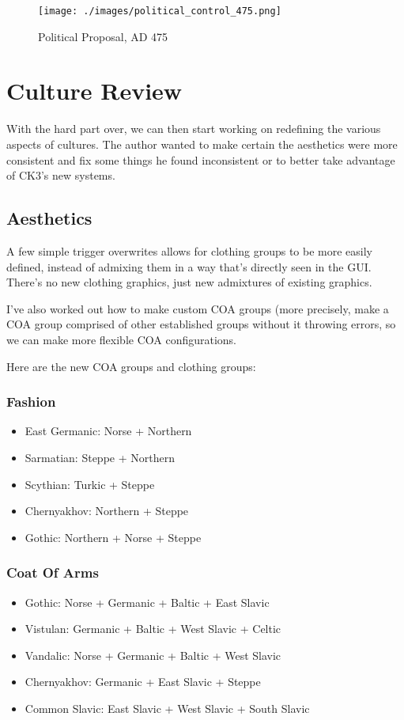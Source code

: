 \documentclass{article}
\begin{document}
	\begin{figure}[h!]
		\centering
		\texttt{[image: ./images/political\_control\_475.png]}
		\caption{Political Proposal, AD 475}
	\end{figure}
	
	\newpage
	
	\section{Culture Review}
	\label{sec:culture_review}
	
	With the hard part over, we can then start working on redefining the various aspects of cultures.
	The author wanted to make certain the aesthetics were more consistent and fix some things he found inconsistent or to better take advantage of CK3's new systems.
	
	\subsection{Aesthetics}
	\label{sec:culture_review:subsec:aesthetics}
	A few simple trigger overwrites allows for clothing groups to be more easily defined, instead of admixing them in a way that’s directly seen in the GUI. There’s no new clothing graphics, just new admixtures of existing graphics.
	
	I’ve also worked out how to make custom COA groups (more precisely, make a COA group comprised of other established groups without it throwing errors, so we can make more flexible COA configurations.
	
	Here are the new COA groups and clothing groups:
	
	\subsubsection{Fashion}
	\begin{itemize}
		\item East Germanic: Norse + Northern
		\item Sarmatian: Steppe + Northern
		\item Scythian: Turkic + Steppe
		\item Chernyakhov: Northern + Steppe
		\item Gothic: Northern + Norse + Steppe
	\end{itemize}
	
	\subsubsection{Coat Of Arms}
	\begin{itemize}
		\item Gothic: Norse + Germanic + Baltic + East Slavic
		\item Vistulan: Germanic + Baltic + West Slavic + Celtic
		\item Vandalic: Norse + Germanic + Baltic + West Slavic
		\item Chernyakhov: Germanic + East Slavic + Steppe
		\item Common Slavic: East Slavic + West Slavic + South Slavic
	\end{itemize}
	
\end{document}
